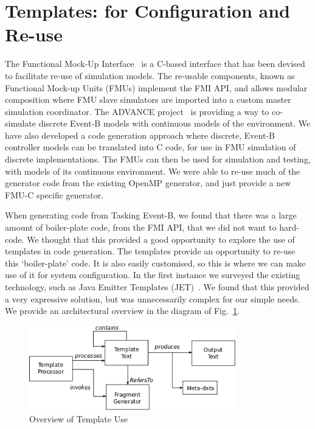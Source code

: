 \documentclass{llncs}%
\begin{document}
\section{Templates: for Configuration and Re-use}\label{templates}
%
The Functional Mock-Up Interface~\cite{FMISTD} is a C-based interface that has been devised to facilitate re-use of simulation models. The re-usable components, known as Functional Mock-up Units (FMUs) implement the FMI API, and allows modular composition where FMU slave simulators are imported into a custom master simulation coordinator. The ADVANCE project~\cite{advance} is providing a way to co-simulate discrete Event-B models with continuous models of the environment. We have also developed a code generation approach where discrete, Event-B controller models can be translated into C code, for use in FMU simulation of discrete implementations. The FMUs can then be used for simulation and testing, with models of its continuous environment. We were able to re-use much of the generator code from the existing OpenMP generator, and just provide a new FMU-C specific generator.  

When generating code from Tasking Event-B, we found that there was a large amount of boiler-plate code, from the FMI API, that we did not want to hard-code. We thought that this provided a good opportunity to explore the use of templates in code generation. The templates provide an opportunity to re-use this `boiler-plate' code. It is also easily customised, so this is where we can make use of it for system configuration. In the first instance we surveyed the existing technology, such as Java Emitter Templates (JET)~\cite{JET}. We found that this provided a very expressive solution, but was unnecessarily complex for our simple needs. We provide an architectural overview in the diagram of Fig.~\ref{fig:templates}.
%
\begin{figure}
\centering
\includegraphics[width=0.8\textwidth]{templateOverview.png}
\caption{Overview of Template Use}
\label{fig:templates}
\end{figure}
%
\end{document}
